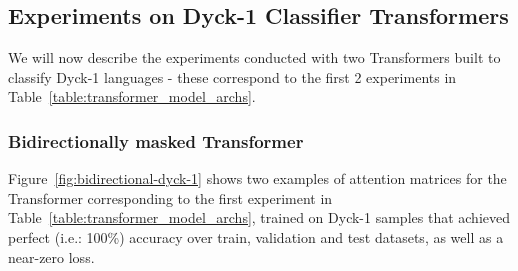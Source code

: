 \subsection{Experiments on Dyck-1 Classifier Transformers}

We will now describe the experiments conducted with two Transformers built to classify Dyck-1 languages - these correspond to the first 2 experiments in Table~\ref{table:transformer_model_archs}.

\subsubsection{Bidirectionally masked Transformer} \label{subsubsection:bidirectional-dyck-1}
Figure~\ref{fig:bidirectional-dyck-1} shows two examples of attention matrices for the Transformer corresponding to the first experiment in Table~\ref{table:transformer_model_archs}, trained on Dyck-1 samples that achieved perfect (i.e.: 100\%) accuracy over train, validation and test datasets, as well as a near-zero loss.

